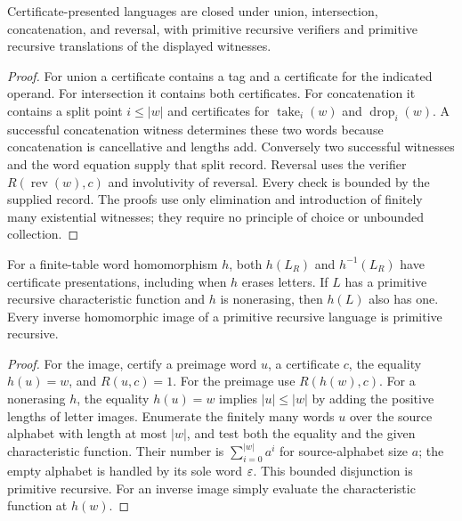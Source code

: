 \begin{proposition}
\label{eff:binary-closure}
Certificate-presented languages are closed under union, intersection,
concatenation, and reversal, with primitive recursive verifiers and
primitive recursive translations of the displayed witnesses.
\end{proposition}
\begin{proof}
For union a certificate contains a tag and a certificate for the indicated
operand.  For intersection it contains both certificates.  For
concatenation it contains a split point $i\leq |w|$ and certificates for
$\operatorname{take}_i(w)$ and $\operatorname{drop}_i(w)$.  A successful
concatenation witness determines these two words because concatenation is
cancellative and lengths add.  Conversely two successful witnesses and the
word equation supply that split record.  Reversal uses the verifier
$R(\operatorname{rev}(w),c)$ and involutivity of reversal.  Every check is
bounded by the supplied record.  The proofs use only elimination and
introduction of finitely many existential witnesses; they require no
principle of choice or unbounded collection.
\end{proof}

\begin{proposition}
\label{eff:hom-closure}
For a finite-table word homomorphism $h$, both $h(L_R)$ and
$h^{-1}(L_R)$ have certificate presentations, including when $h$ erases
letters.  If $L$ has a primitive recursive characteristic function and
$h$ is nonerasing, then $h(L)$ also has one.  Every inverse homomorphic
image of a primitive recursive language is primitive recursive.
\end{proposition}
\begin{proof}
For the image, certify a preimage word $u$, a certificate $c$, the equality
$h(u)=w$, and $R(u,c)=1$.  For the preimage use $R(h(w),c)$.
For a nonerasing $h$, the equality $h(u)=w$ implies $|u|\leq |w|$ by adding
the positive lengths of letter images.  Enumerate the finitely many words
$u$ over the source alphabet with length at most $|w|$, and test both the
equality and the given characteristic function.  Their number is
$\sum_{i=0}^{|w|}a^i$ for source-alphabet size $a$; the empty alphabet is
handled by its sole word $\varepsilon$.  This bounded disjunction is primitive
recursive.  For an inverse image simply evaluate the characteristic
function at $h(w)$.
\end{proof}

